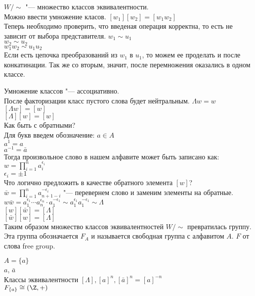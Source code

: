 $W/\sim$ "--- множество классов эквивалентности.\\

Можно ввести умножение класов. 
$[w_1][w_2] = [w_1w_2]$ \\

Теперь необходимо проверить, что введеная операция корректна, то есть не зависит от выбора представителя. 
$w_1 \sim u_1$\\
$w_2 \sim u_2$\\
$w_1w_2 \sim u_1u_2$\\
Если есть цепочка преобразований из $w_1$ в $u_1$, то можем ее проделать и после конкатинации. Так же со вторым, 
значит, после перемножения оказались в одном классе.


Умножение классов "--- ассоциативно.\\

После факторизации класс пустого слова будет нейтральным. 
$\Lambda w = w$\\
$[\Lambda w] = [w]$\\
$[\Lambda][w] = [w]$\\

Как быть с обратными?\\
Для букв введем обозначение:
$a \in A$\\
$a^1 = a$\\
$a^{-1} = \bar{a}$\\
Тогда произвольное слово в нашем алфавите может быть записано как:
$w = \prod_{i = 1}^{n} a_i^{\epsilon_i}$\\
$\epsilon_i = \pm 1$\\
Что логично предложить в качестве обратного элемента $[w]$?\\
$\bar{w} = \prod_{i = 1}^{n} a_{n + 1 - i}^{-\epsilon_i}$ "--- перевернем слово и заменим элементы на обратные.\\
$w\bar{w} = a_1^{\epsilon_1} \cdots a_n^{\epsilon_n} \cdot a_1^{-\epsilon_1} \sim a_1^{\epsilon_1}a_1^{-\epsilon_1} \sim \Lambda$\\
$[w][\bar{w}] = [\Lambda]$\\
$[\bar{w}][w] = [\Lambda]$\\

Таким образом множество классов эквивалентностей $W/\sim$ превратилась группу.\\
Эта группа обозначается $F_A$ и называется свободная группа с алфавитом $A$.
$F$ от слова free group.

\begin{exmp}
$A = \{a\}$ \\
$a$, $\bar{a}$\\
Классы эквивалентности 
$[\Lambda], [a]^n, [\bar{a}]^n = [a]^{-n}$\\
$F_{\{a\}} \cong (\Z,+)$\\
\end{exmp}

